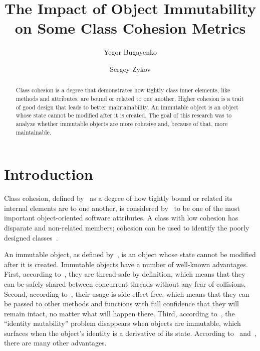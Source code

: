 \documentclass[sigconf,10pt,nonacm=true]{acmart}
\title{The Impact of Object Immutability on Some Class Cohesion Metrics}
\author{Yegor Bugayenko}
\affiliation{\institution{Huawei Technologies Co., Ltd.}}
\author{Sergey Zykov}
\affiliation{\institution{Higher School of Economics}}
\begin{document}
\begin{abstract}
Class cohesion is a degree that demonstrates how tightly class
inner elements, like methods and attributes, are bound or related
to one another. Higher cohesion is a trait of good design that
leads to better maintainability.
An immutable object is an object whose state cannot
be modified after it is created.
The goal of this research was to analyze whether immutable objects
are more cohesive and, because of that, more maintainable.
\end{abstract}

\maketitle

\section{Introduction}

Class cohesion, defined by~\citet{yourdon78}
as a degree of how tightly bound or related its internal
elements are to one another,
is considered by~\citet{kabaili01} to be one of the most
important object-oriented software attributes.
A class with low cohesion has disparate and non-related members;
cohesion can be used to identify the poorly designed
classes~\citep{badri08,basili96,chowdhury11}.

An immutable object, as defined by~\citet{goetz05}, is
an object whose state cannot be modified after it is created. Immutable
objects have a number of well-known advantages. First, according to~\citet{bloch06},
they are thread-safe by definition, which means that they can be safely shared between
concurrent threads without any fear of collisions. Second,
according to~\citet{hakonen99}, their usage
is side-effect free, which means that they can be passed to other methods
and functions with full confidence that they will remain intact, no matter
what will happen there. Third, according
to~\citet{nayebi17}, the ``identity mutability'' problem disappears
when objects are immutable, which surfaces when the object's identity is a
derivative of its state. According to~\citet[pp.74--93]{eo1} and~\citet{nayebi17},
there are many other advantages.
\end{document}
